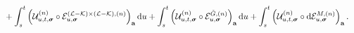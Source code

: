 \begin{lemma}
\begin{align}
    &+ \int_{s}^t \left(\mathcal{U}^{(n)}_{u, t, {\boldsymbol{\sigma}}} \circ \mathcal{E}^{(\mathcal L-\mathcal K)\times(\mathcal L-\mathcal K),(n)}_{u, {\boldsymbol{\sigma}}}\right)_{{\mathbf{a}}} \mathrm{d} u  + \int_{s}^t \left(\mathcal{U}^{(n)}_{u, t, {\boldsymbol{\sigma}}} \circ \mathcal E^{{\mathring G},(n)}_{u, {\boldsymbol{\sigma}}}\right)_{{\mathbf{a}}} \mathrm{d} u + \int_{s}^t \left(\mathcal{U}^{(n)}_{u, t, {\boldsymbol{\sigma}}} \circ \mathrm{d} \mathcal E^{M,(n)}_{u, {\boldsymbol{\sigma}}}\right)_{{\mathbf{a}}} .
\end{align}
\end{lemma}


